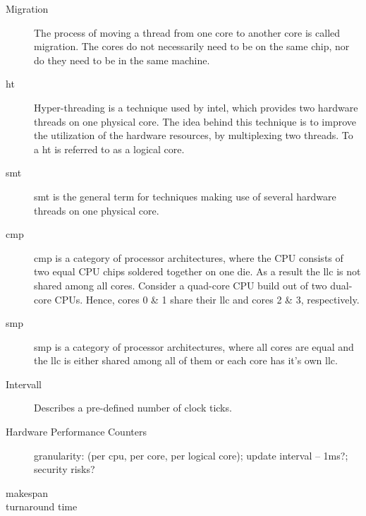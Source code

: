 \begin{description}
  \item[Migration] The process of moving a thread from one core to another core
    is called migration.
    The cores do not necessarily need to be on the same chip, nor do they need
    to be in the same machine.

  \item[\Gls{ht}] Hyper-threading is a technique used by \gls{intel}, which
    provides two hardware threads on one physical core.
    The idea behind this technique is to improve the utilization of the
    hardware resources, by multiplexing two threads.
    To a \Gls{ht} is referred to as a logical core.

  \item[\Gls{smt}] \gls{smt} is the general term for techniques making use of
    several hardware threads on one physical core.

  \item[\Gls{cmp}] \gls{cmp} is a category of processor architectures, where
    the CPU consists of two equal CPU chips soldered together on one die.
    As a result the \gls{llc} is not shared among all cores.
    Consider a quad-core CPU build out of two dual-core CPUs.
    Hence, cores 0 \& 1 share their \gls{llc} and cores 2 \& 3, respectively.

  \item[\Gls{smp}] \gls{smp} is a category of processor architectures, where
    all cores are equal and the \gls{llc} is either shared among all of them or
    each core has it's own \gls{llc}.

  \item[Intervall] Describes a pre-defined number of clock ticks.

  \item[Hardware Performance Counters]  granularity: (per
    cpu, per core, per logical core);
    update interval -- 1ms?;
    security risks?

  \item[makespan]

  \item[turnaround time]



\end{description}
